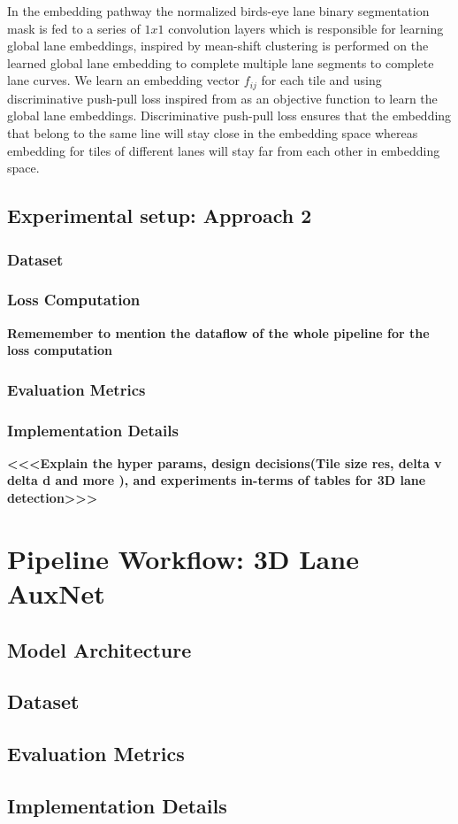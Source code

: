      In the embedding pathway the normalized birds-eye lane binary segmentation mask is fed to a series of $1x1$ convolution layers which is responsible for learning global lane embeddings, inspired by \cite{DBLP:journals/corr/abs-1802-05591} mean-shift clustering is performed on the learned global lane embedding to complete multiple lane segments to complete lane curves. We learn an embedding vector $f_{ij}$ for each tile and using discriminative push-pull loss inspired from \cite{DBLP:journals/corr/abs-2011-01535} \cite{DBLP:journals/corr/abs-1802-05591} as an objective function to learn the global lane embeddings. Discriminative push-pull loss ensures that the embedding that belong to the same line will stay close in the embedding space whereas embedding for tiles of different lanes will stay far from each other in embedding space. 

    \subsection{Experimental setup: Approach 2}
        \subsubsection{Dataset}
        
        \subsubsection{Loss Computation}
            \textbf{Rememember to mention the dataflow of the whole pipeline for the loss computation}
        
        \subsubsection{Evaluation Metrics}
        
        
        \subsubsection{Implementation Details}
            
            \textbf{<<<Explain the hyper params, design decisions(Tile size res, delta v delta d and more ), and experiments in-terms of tables for 3D lane detection>>>}
    
    \section{Pipeline Workflow: 3D Lane AuxNet}
        \subsection{Model Architecture}
        \subsection{Dataset}
        \subsection{Evaluation Metrics}
        \subsection{Implementation Details}
        

